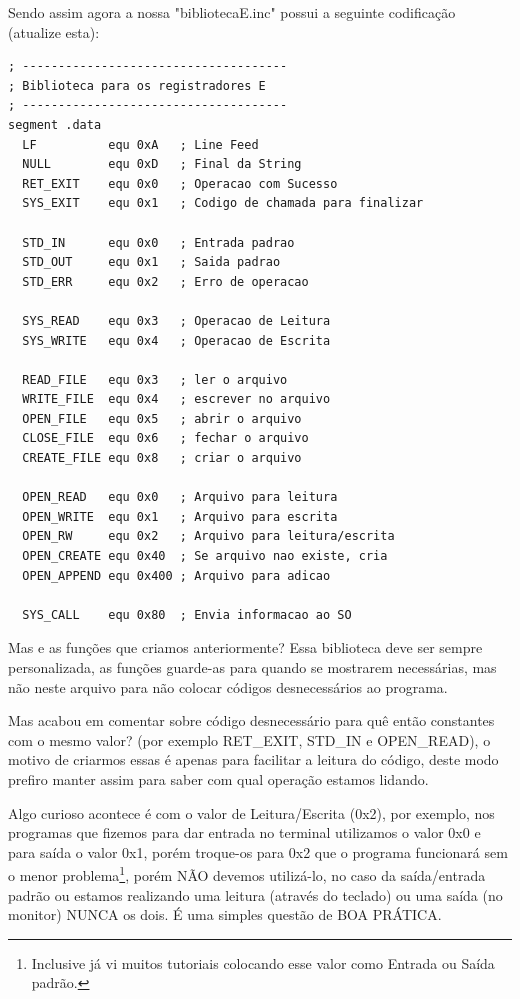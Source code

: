 Sendo assim agora a nossa "bibliotecaE.inc" possui a seguinte codificação (atualize esta):
\begin{lstlisting}[]
; -------------------------------------
; Biblioteca para os registradores E
; -------------------------------------
segment .data
  LF          equ 0xA   ; Line Feed
  NULL        equ 0xD   ; Final da String
  RET_EXIT    equ 0x0   ; Operacao com Sucesso
  SYS_EXIT    equ 0x1   ; Codigo de chamada para finalizar

  STD_IN      equ 0x0   ; Entrada padrao
  STD_OUT     equ 0x1   ; Saida padrao
  STD_ERR     equ 0x2   ; Erro de operacao
 
  SYS_READ    equ 0x3   ; Operacao de Leitura
  SYS_WRITE   equ 0x4   ; Operacao de Escrita

  READ_FILE   equ 0x3   ; ler o arquivo
  WRITE_FILE  equ 0x4   ; escrever no arquivo
  OPEN_FILE   equ 0x5   ; abrir o arquivo
  CLOSE_FILE  equ 0x6   ; fechar o arquivo
  CREATE_FILE equ 0x8   ; criar o arquivo
  
  OPEN_READ   equ 0x0   ; Arquivo para leitura
  OPEN_WRITE  equ 0x1   ; Arquivo para escrita
  OPEN_RW     equ 0x2   ; Arquivo para leitura/escrita
  OPEN_CREATE equ 0x40  ; Se arquivo nao existe, cria
  OPEN_APPEND equ 0x400 ; Arquivo para adicao  

  SYS_CALL    equ 0x80  ; Envia informacao ao SO	
\end{lstlisting}	

Mas e as funções que criamos anteriormente? Essa biblioteca deve ser sempre personalizada, as funções guarde-as para quando se mostrarem necessárias, mas não neste arquivo para não colocar códigos desnecessários ao programa.

Mas acabou em comentar sobre código desnecessário para quê então constantes com o mesmo valor? (por exemplo RET\_EXIT, STD\_IN e OPEN\_READ), o motivo de criarmos essas é apenas para facilitar a leitura do código, deste modo prefiro manter assim para saber com qual operação estamos lidando.

Algo curioso acontece é com o valor de Leitura/Escrita (0x2), por exemplo, nos programas que fizemos para dar entrada no terminal utilizamos o valor 0x0 e para saída o valor 0x1, porém troque-os para 0x2 que o programa funcionará sem o menor problema\footnote{Inclusive já vi muitos tutoriais colocando esse valor como Entrada ou Saída padrão.}, porém NÃO devemos utilizá-lo, no caso da saída/entrada padrão ou estamos realizando uma leitura (através do teclado) ou uma saída (no monitor) NUNCA os dois. É uma simples questão de BOA PRÁTICA.


